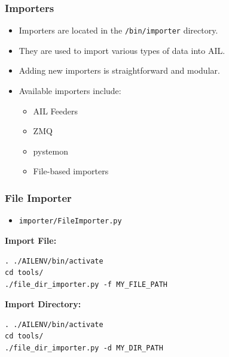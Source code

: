 \documentclass[10pt,aspectratio=169, colorlinks=true, linkcolor=circlBlue]{beamer}
\begin{document}
\begin{frame}
    \frametitle{Importers}
    \begin{itemize}
        \item Importers are located in the \texttt{/bin/importer} directory.
        \item They are used to import various types of data into AIL.
        \item Adding new importers is straightforward and modular.
        \item Available importers include:
        \begin{itemize}
            \item AIL Feeders
            \item ZMQ
            \item pystemon
            \item File-based importers
        \end{itemize}
    \end{itemize}
\end{frame}


\begin{frame}[fragile]
    \frametitle{File Importer}

    \begin{itemize}
        \item \texttt{importer/FileImporter.py}
    \end{itemize}

    \textbf{Import File:}
    \begin{tcolorbox}[colback=black!85, coltext=green, title=Import a Single File, fonttitle=\bfseries, arc=2mm, boxrule=0.4pt]
\begin{verbatim}
. ./AILENV/bin/activate
cd tools/
./file_dir_importer.py -f MY_FILE_PATH
\end{verbatim}
    \end{tcolorbox}

    \vspace{0.3cm}

    \textbf{Import Directory:}
    \begin{tcolorbox}[colback=black!85, coltext=green, title=Import a Directory, fonttitle=\bfseries, arc=2mm, boxrule=0.4pt]
\begin{verbatim}
. ./AILENV/bin/activate
cd tools/
./file_dir_importer.py -d MY_DIR_PATH
\end{verbatim}
    \end{tcolorbox}

\end{frame}
\end{document}
